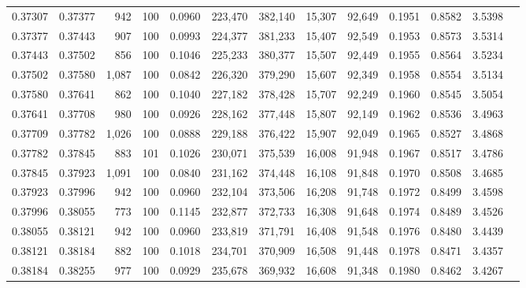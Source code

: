 \begin{tabular}{rrrrrrrrrrrrr}
0.37307 & 0.37377 &   942 & 100 &                                     0.0960 & 223,470 & 382,140 &  15,307 &  92,649 & 0.1951 & 0.8582 & 3.5398 \\
0.37377 & 0.37443 &   907 & 100 &                                     0.0993 & 224,377 & 381,233 &  15,407 &  92,549 & 0.1953 & 0.8573 & 3.5314 \\
0.37443 & 0.37502 &   856 & 100 &                                     0.1046 & 225,233 & 380,377 &  15,507 &  92,449 & 0.1955 & 0.8564 & 3.5234 \\
0.37502 & 0.37580 & 1,087 & 100 &                                     0.0842 & 226,320 & 379,290 &  15,607 &  92,349 & 0.1958 & 0.8554 & 3.5134 \\
0.37580 & 0.37641 &   862 & 100 &                                     0.1040 & 227,182 & 378,428 &  15,707 &  92,249 & 0.1960 & 0.8545 & 3.5054 \\
0.37641 & 0.37708 &   980 & 100 &                                     0.0926 & 228,162 & 377,448 &  15,807 &  92,149 & 0.1962 & 0.8536 & 3.4963 \\
0.37709 & 0.37782 & 1,026 & 100 &                                     0.0888 & 229,188 & 376,422 &  15,907 &  92,049 & 0.1965 & 0.8527 & 3.4868 \\
0.37782 & 0.37845 &   883 & 101 &                                     0.1026 & 230,071 & 375,539 &  16,008 &  91,948 & 0.1967 & 0.8517 & 3.4786 \\
0.37845 & 0.37923 & 1,091 & 100 &                                     0.0840 & 231,162 & 374,448 &  16,108 &  91,848 & 0.1970 & 0.8508 & 3.4685 \\
0.37923 & 0.37996 &   942 & 100 &                                     0.0960 & 232,104 & 373,506 &  16,208 &  91,748 & 0.1972 & 0.8499 & 3.4598 \\
0.37996 & 0.38055 &   773 & 100 &                                     0.1145 & 232,877 & 372,733 &  16,308 &  91,648 & 0.1974 & 0.8489 & 3.4526 \\
0.38055 & 0.38121 &   942 & 100 &                                     0.0960 & 233,819 & 371,791 &  16,408 &  91,548 & 0.1976 & 0.8480 & 3.4439 \\
0.38121 & 0.38184 &   882 & 100 &                                     0.1018 & 234,701 & 370,909 &  16,508 &  91,448 & 0.1978 & 0.8471 & 3.4357 \\
0.38184 & 0.38255 &   977 & 100 &                                     0.0929 & 235,678 & 369,932 &  16,608 &  91,348 & 0.1980 & 0.8462 & 3.4267 \\

\end{tabular}
